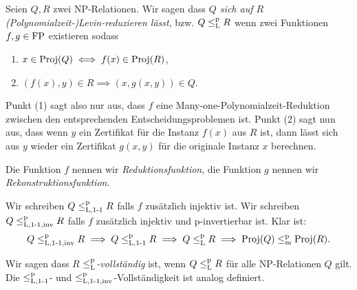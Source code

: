 \begin{definition}
    Seien $Q, R$ zwei NP-Relationen. Wir sagen dass \emph{$Q$ sich auf $R$ (Polynomialzeit-)Levin-reduzieren lässt}, bzw. $Q\leq_\mathrm{L}^\mathrm{p} R$ wenn zwei Funktionen $f, g\in \mathrm{FP}$ existieren sodass
    \begin{enumerate}
        \item $x\in\operatorname{Proj}(Q) \iff f(x)\in\operatorname{Proj}(R)$,
        \item $(f(x), y)\in R \implies (x, g(x,y))\in Q$.
    \end{enumerate}
    Punkt (1) sagt also nur aus, dass $f$ eine Many-one-Polynomialzeit-Reduktion zwischen den entsprechenden Entscheidungsproblemen ist.
    Punkt (2) sagt nun aus, dass wenn $y$ ein Zertifikat für die Instanz $f(x)$ aus $R$ ist, dann lässt sich aus $y$ wieder ein Zertifikat $g(x,y)$ für die originale Instanz $x$ berechnen.

    Die Funktion $f$ nennen wir \emph{Reduktionsfunktion}, die Funktion $g$ nennen wir \emph{Rekonstruktionsfunktion}.

    Wir schreiben $Q\leq_\mathrm{L,1\text{-}1}^\mathrm p R$ falls $f$ zusätzlich injektiv ist. Wir schreiben $Q\leq_\mathrm{L,1\text{-}1,inv}^\mathrm p R$ falls $f$ zusätzlich injektiv und p-invertierbar ist. Klar ist:
    \[ Q\leq_\mathrm{L,1\text{-}1,inv}^\mathrm p R \implies Q \leq_\mathrm{L,1\text{-}1}^\mathrm p R \implies Q \leq_\mathrm{L}^\mathrm{p} R \implies \operatorname{Proj}(Q) \leq_\mathrm{m}^\mathrm{p} \operatorname{Proj}(R). \]

    Wir sagen dass $R$ \emph{$\leq_\mathrm{L}^\mathrm{p}$-vollständig} ist, wenn $Q\leq_\mathrm{L}^\mathrm{p} R$ für alle NP-Relationen $Q$ gilt. Die $\leq_\mathrm{L,1\text{-}1}^\mathrm p$- und $\leq_\mathrm{L,1\text{-}1,inv}^\mathrm p$-Vollständigkeit ist analog definiert.
\end{definition}

